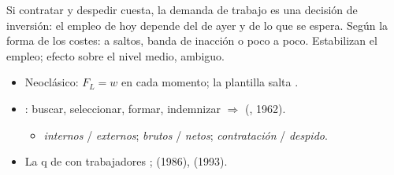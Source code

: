 \documentclass{article}
\begin{document}
\begin{columnas}
\begin{ideaclave}
Si contratar y despedir cuesta, la demanda de trabajo es una decisión de inversión: el empleo de hoy depende del de ayer y de lo que se espera. Según la forma de los costes: a saltos, banda de inacción o poco a poco. Estabilizan el empleo; efecto sobre el nivel medio, ambiguo.
\end{ideaclave}

\begin{itemize}
\item Neoclásico: $F_L=w$ en cada momento; la plantilla salta .
\item {}: buscar, seleccionar, formar, indemnizar $\Rightarrow$  (, 1962).
  \begin{itemize}
  \item \emph{internos} / \emph{externos}; \emph{brutos} / \emph{netos}; \emph{contratación} / \emph{despido}.
  \end{itemize}
\item La q de  con trabajadores ;  (1986),  (1993).
\end{itemize}


\end{columnas}
\end{document}
